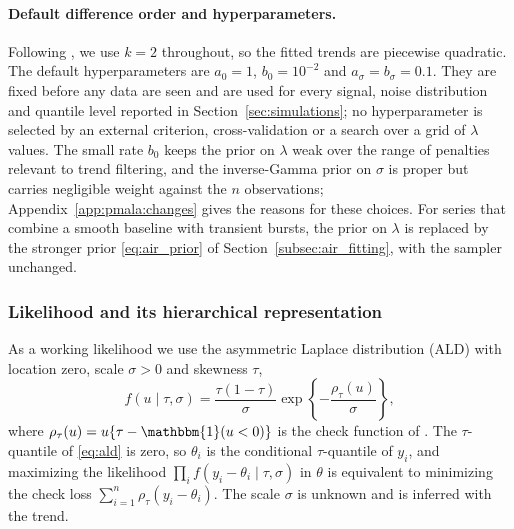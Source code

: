 \paragraph{Default difference order and hyperparameters.} Following \citet{brantley2020baseline}, we use $k = 2$ throughout, so the fitted trends are piecewise quadratic. The default hyperparameters are $a_0 = 1$, $b_0 = 10^{-2}$ and $a_\sigma = b_\sigma = 0.1$. They are fixed before any data are seen and are used for every signal, noise distribution and quantile level reported in Section~\ref{sec:simulations}; no hyperparameter is selected by an external criterion, cross-validation or a search over a grid of $\lambda$ values. The small rate $b_0$ keeps the prior on $\lambda$ weak over the range of penalties relevant to trend filtering, and the inverse-Gamma prior on $\sigma$ is proper but carries negligible weight against the $n$ observations; Appendix~\ref{app:pmala:changes} gives the reasons for these choices. For series that combine a smooth baseline with transient bursts, the prior on $\lambda$ is replaced by the stronger prior \eqref{eq:air_prior} of Section~\ref{subsec:air_fitting}, with the sampler unchanged.

\subsubsection{Likelihood and its hierarchical representation}

As a working likelihood we use the asymmetric Laplace distribution (ALD) with location zero, scale $\sigma > 0$ and skewness $\tau$,
\begin{equation}
    f(u \mid \tau, \sigma) = \frac{\tau(1-\tau)}{\sigma}
    \exp\!\left\{-\frac{\rho_\tau(u)}{\sigma}\right\},
    \label{eq:ald}
\end{equation}
where $\rho_\tau(u) = u\{\tau - \mathbbm{1}(u < 0)\}$ is the check function of \citet{koenker1978regression}. The $\tau$-quantile of \eqref{eq:ald} is zero, so $\theta_i$ is the conditional $\tau$-quantile of $y_i$, and maximizing the likelihood $\prod_i f(y_i - \theta_i \mid \tau, \sigma)$ in $\theta$ is equivalent to minimizing the check loss $\sum_{i=1}^n \rho_\tau(y_i-\theta_i)$. The scale $\sigma$ is unknown and is inferred with the trend.

